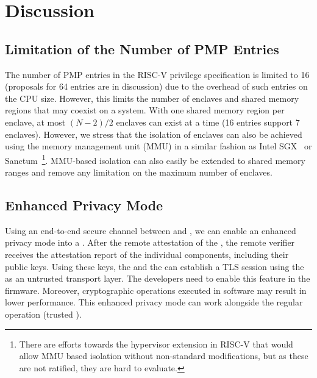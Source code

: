 \section{Discussion}
\label{sec:discussion}

\subsection{Limitation of the Number of PMP Entries} 
The number of PMP entries in the RISC-V privilege specification is limited to 16 (proposals for 64 entries are in discussion) due to the overhead of such entries on the CPU size. However, this limits the number of enclaves and shared memory regions that may coexist on a system. With one shared memory region per enclave, at most $(N-2)/2$ enclaves can exist at a time (16 entries support 7 enclaves). However, we stress that the isolation of enclaves can also be achieved using the memory management unit (MMU) in a similar fashion as Intel SGX~\cite{costan2016intel} or Sanctum~\cite{costan2016sanctum}\footnote{There are efforts towards the hypervisor extension in RISC-V that would allow MMU based isolation without non-standard modifications, but as these are not ratified, they are hard to evaluate.}. MMU-based isolation can also easily be extended to shared memory ranges and remove any limitation on the maximum number of enclaves. 


\subsection{Enhanced Privacy Mode} 
Using an end-to-end secure channel between \app and \sphw, we can enable an enhanced privacy mode into a \nameenclave. After the remote attestation of the \nameenclave, the remote verifier receives the attestation report of the individual components, including their public keys. Using these keys, the \app and the \sphw can establish a TLS session using the \ce as an untrusted transport layer. The developers need to enable this feature in the \sphw firmware. Moreover, cryptographic operations executed in software may result in lower performance. This enhanced privacy mode can work alongside the regular operation (trusted \ce). 

